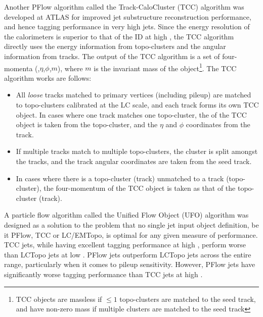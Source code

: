 Another PFlow algorithm called the Track-CaloCluster (TCC) algorithm \cite{Atlas:TCC} was developed at ATLAS for improved jet substructure reconstruction performance, and hence tagging performance in very high \pt jets. Since the energy resolution of the calorimeters is superior to that of the ID at high \pt, the TCC algorithm directly uses the energy information from topo-clusters and the angular information from tracks. The output of the TCC algorithm is a set of four-momenta (\pt,$\eta$,$\phi$,$m$), where $m$ is the invariant mass of the object\footnote{TCC objects are massless if $\leq 1$ topo-clusters are matched to the seed track, and have non-zero mass if multiple clusters are matched to the seed track}. The TCC algorithm works are follows:
\begin{itemize}
    \item All \textit{loose} tracks matched to primary vertices (including pileup) are matched to topo-clusters calibrated at the LC scale, and each track forms its own TCC object. In cases where one track matches one topo-cluster, the \pt of the TCC object is taken from the topo-cluster, and the $\eta$ and $\phi$ coordinates from the track.
    \item If multiple tracks match to multiple topo-clusters, the cluster \pt is split amongst the tracks, and the track angular coordinates are taken from the seed track.
    \item In cases where there is a topo-cluster (track) unmatched to a track (topo-cluster), the four-momentum of the TCC object is taken as that of the topo-cluster (track).
\end{itemize}
A particle flow algorithm called the Unified Flow Object (UFO) algorithm was designed as a solution to the problem that no single jet input object definition, be it PFlow, TCC or LC/EMTopo, is optimal for any given measure of performance. TCC jets, while having excellent tagging performance at high \pt, perform worse than LCTopo jets at low \pt. PFlow jets outperform LCTopo jets across the entire \pt range, particularly when it comes to pileup sensitivity. However, PFlow jets have significantly worse tagging performance than TCC jets at high \pt. 

